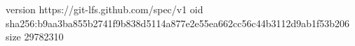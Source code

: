 version https://git-lfs.github.com/spec/v1
oid sha256:b9aa3ba855b2741f9b838d5114a877e2e55ea662cc56c44b3112d9ab1f53b206
size 29782310
